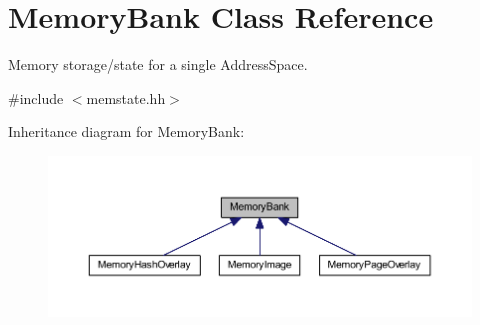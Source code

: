 \hypertarget{class_memory_bank}{}\section{Memory\+Bank Class Reference}
\label{class_memory_bank}


Memory storage/state for a single Address\+Space.  




{\ttfamily \#include $<$memstate.\+hh$>$}



Inheritance diagram for Memory\+Bank\+:
\nopagebreak
\begin{figure}[H]
\begin{center}
\leavevmode
\includegraphics[width=350pt]{class_memory_bank__inherit__graph}
\end{center}
\end{figure}
